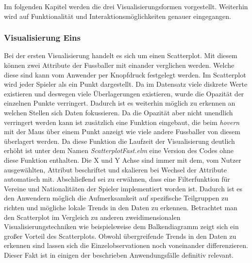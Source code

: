 \documentclass[usegeometry=true]{scrartcl}
\begin{document}
Im folgenden Kapitel werden die drei Visualisierungsformen vorgestellt. Weiterhin wird auf Funktionalität und Interaktionsmöglichkeiten genauer eingegangen.


\subsubsection{Visualisierung Eins}
Bei der ersten Visualisierung handelt es sich um einen Scatterplot.
Mit diesem können zwei Attribute der Fussballer mit einander verglichen werden. Welche diese sind kann vom Anwender per Knopfdruck festgelegt werden. Im Scatterplot wird jeder Spieler als ein Punkt dargestellt. Da im Datensatz viele diskrete Werte existieren und deswegen viele Überlagerungen existieren, wurde die Opazität der einzelnen Punkte verringert. Dadurch ist es weiterhin möglich zu erkennen an welchen Stellen sich Daten fokussieren. Da die Opazität aber nicht unendlich verringert werden kann ist zusätzlich eine Funktion eingebaut, die beim \textit{hovern} mit der Maus über einem Punkt anzeigt wie viele andere Fussballer von diesem überlagert werden. Da diese Funktion die Laufzeit der Visualisierung deutlich erhöht ist unter dem Namen \textit{ScatterplotFast.elm} eine Version des Codes ohne diese Funktion enthalten.
Die X und Y Achse sind immer mit dem, vom Nutzer ausgewählten, Attribut beschriftet und skalieren bei Wechsel der Attribute automatisch mit.
Abschließend sei zu erwähnen, dass eine Filterfunktion für Vereine und Nationalitäten der Spieler implementiert worden ist. Dadurch ist es den Anwendern möglich die Aufmerksamkeit auf spezifische Teilgruppen zu richten und mögliche lokale Trends in den Daten zu erkennen.
Betrachtet man den Scatterplot im Vergleich zu anderen zweidimensionalen Visualisierungstechniken wie beispielsweise dem Balkendiagramm zeigt sich ein großer Vorteil des Scatterplots. Obwohl übergreifende Trends in den Daten zu erkennen sind lassen sich die Einzelobservationen noch voneinander differenzieren. Dieser Fakt ist in einigen der beschrieben Anwendungsfälle definitiv relevant.
\end{document}
